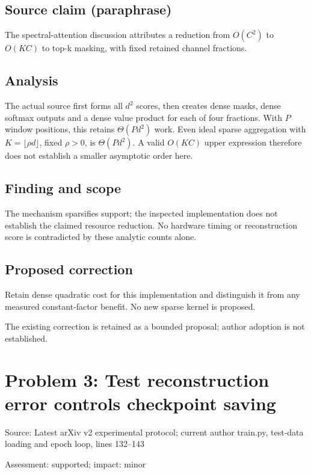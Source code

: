 \documentclass[11pt]{article}
\begin{document}
\subsection*{Source claim (paraphrase)}

The spectral-attention discussion attributes a reduction from \(O(C^2)\) to \(O(KC)\) to top-k masking, with fixed retained channel fractions.

\subsection*{Analysis}

The actual source first forms all \(d^2\) scores, then creates dense masks, dense softmax outputs and a dense value product for each of four fractions. With \(P\) window positions, this retains \(\Theta(Pd^2)\) work. Even ideal sparse aggregation with \(K=\lfloor\rho d\rfloor\), fixed \(\rho>0\), is \(\Theta(Pd^2)\). A valid \(O(KC)\) upper expression therefore does not establish a smaller asymptotic order here.

\subsection*{Finding and scope}

The mechanism sparsifies support; the inspected implementation does not establish the claimed resource reduction. No hardware timing or reconstruction score is contradicted by these analytic counts alone.

\subsection*{Proposed correction}

Retain dense quadratic cost for this implementation and distinguish it from any measured constant-factor benefit. No new sparse kernel is proposed.

The existing correction is retained as a bounded proposal; author adoption is not established.

\section*{Problem 3: Test reconstruction error controls checkpoint saving}

Source: Latest arXiv v2 experimental protocol; current author train.py, test-data loading and epoch loop, lines 132–143

Assessment: supported; impact: minor
\end{document}

